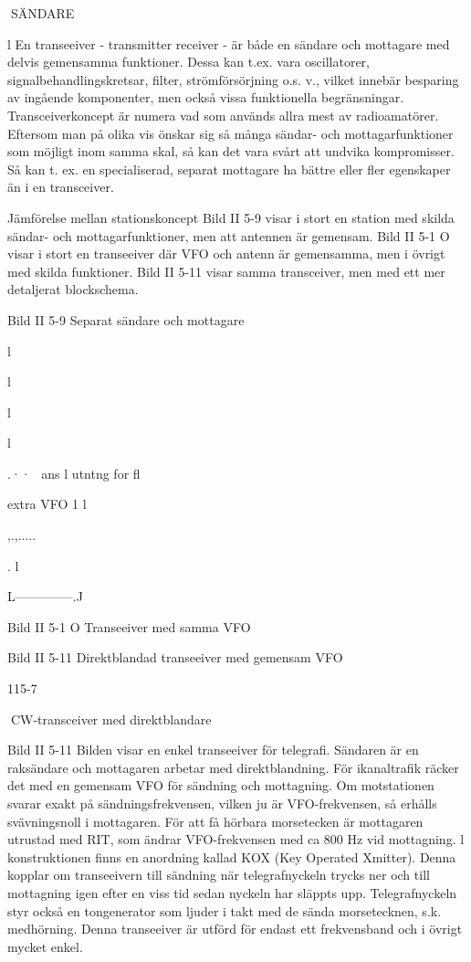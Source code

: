 SÄNDARE

l
En transeeiver - transmitter receiver - är
både en sändare och mottagare med delvis
gemensamma funktioner. Dessa kan t.ex.
vara oscillatorer, signalbehandlingskretsar,
filter, strömförsörjning o.s. v., vilket innebär
besparing av ingående komponenter, men
också vissa funktionella begränsningar.
Transceiverkoncept är numera vad som
används allra mest av radioamatörer. Eftersom man på olika vis önskar sig så många
sändar- och mottagarfunktioner som möjligt
inom samma skal, så kan det vara svårt att
undvika kompromisser. Så kan t. ex. en
specialiserad, separat mottagare ha bättre
eller fler egenskaper än i en transceiver.

Jämförelse mellan stationskoncept
Bild II 5-9 visar i stort en station med skilda
sändar- och mottagarfunktioner, men att
antennen är gemensam.
Bild II 5-1 O visar i stort en transeeiver där
VFO och antenn är gemensamma, men i
övrigt med skilda funktioner.
Bild II 5-11 visar samma transceiver, men
med ett mer detaljerat blockschema.

Bild II 5-9 Separat sändare och mottagare

l

l

l

l

.··~
ans l utntng
for fl

extra VFO
1
l

,.,.....

.
l

L--------------.J

Bild II 5-1 O Transeeiver med samma VFO

Bild II 5-11 Direktblandad transeeiver med gemensam VFO

115-7

CW-transceiver med direktblandare

Bild II 5-11
Bilden visar en enkel transeeiver för telegrafi. Sändaren är en raksändare och mottagaren arbetar med direktblandning. För ikanaltrafik räcker det med en gemensam
VFO för sändning och mottagning. Om motstationen svarar exakt på sändningsfrekvensen, vilken ju är VFO-frekvensen, så
erhålls svävningsnoll i mottagaren. För att
få hörbara morsetecken är mottagaren utrustad med RIT, som ändrar VFO-frekvensen med ca 800 Hz vid mottagning.
l konstruktionen finns en anordning kallad KOX (Key Operated Xmitter). Denna
kopplar om transeeivern till sändning när
telegrafnyckeln trycks ner och till mottagning igen efter en viss tid sedan nyckeln har
släppts upp. Telegrafnyckeln styr också en
tongenerator som ljuder i takt med de sända
morsetecknen, s.k. medhörning.
Denna transeeiver är utförd för endast
ett frekvensband och i övrigt mycket enkel.

